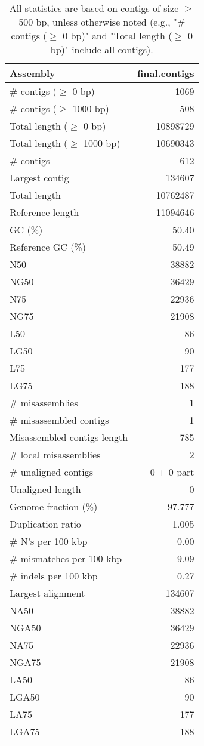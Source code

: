 \documentclass[12pt,a4paper]{article}
\begin{document}
\begin{table}[ht]
\begin{center}
\caption{All statistics are based on contigs of size $\geq$ 500 bp, unless otherwise noted (e.g., "\# contigs ($\geq$ 0 bp)" and "Total length ($\geq$ 0 bp)" include all contigs).}
\begin{tabular}{|l*{1}{|r}|}
\hline
Assembly & final.contigs \\ \hline
\# contigs ($\geq$ 0 bp) & 1069 \\ \hline
\# contigs ($\geq$ 1000 bp) & 508 \\ \hline
Total length ($\geq$ 0 bp) & 10898729 \\ \hline
Total length ($\geq$ 1000 bp) & 10690343 \\ \hline
\# contigs & 612 \\ \hline
Largest contig & 134607 \\ \hline
Total length & 10762487 \\ \hline
Reference length & 11094646 \\ \hline
GC (\%) & 50.40 \\ \hline
Reference GC (\%) & 50.49 \\ \hline
N50 & 38882 \\ \hline
NG50 & 36429 \\ \hline
N75 & 22936 \\ \hline
NG75 & 21908 \\ \hline
L50 & 86 \\ \hline
LG50 & 90 \\ \hline
L75 & 177 \\ \hline
LG75 & 188 \\ \hline
\# misassemblies & 1 \\ \hline
\# misassembled contigs & 1 \\ \hline
Misassembled contigs length & 785 \\ \hline
\# local misassemblies & 2 \\ \hline
\# unaligned contigs & 0 + 0 part \\ \hline
Unaligned length & 0 \\ \hline
Genome fraction (\%) & 97.777 \\ \hline
Duplication ratio & 1.005 \\ \hline
\# N's per 100 kbp & 0.00 \\ \hline
\# mismatches per 100 kbp & 9.09 \\ \hline
\# indels per 100 kbp & 0.27 \\ \hline
Largest alignment & 134607 \\ \hline
NA50 & 38882 \\ \hline
NGA50 & 36429 \\ \hline
NA75 & 22936 \\ \hline
NGA75 & 21908 \\ \hline
LA50 & 86 \\ \hline
LGA50 & 90 \\ \hline
LA75 & 177 \\ \hline
LGA75 & 188 \\ \hline
\end{tabular}
\end{center}
\end{table}
\end{document}
